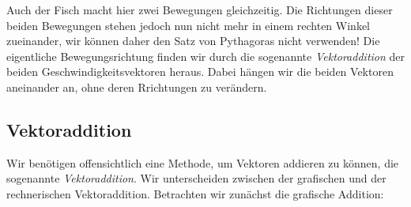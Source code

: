 \begin{solution}
Auch der Fisch macht hier zwei Bewegungen gleichzeitig. Die Richtungen dieser beiden Bewegungen stehen jedoch nun nicht mehr in einem rechten Winkel zueinander, wir können daher den Satz von Pythagoras nicht verwenden! Die eigentliche Bewegungsrichtung finden wir durch die sogenannte \textit{Vektoraddition} der beiden Geschwindigkeitsvektoren heraus. Dabei hängen wir die beiden Vektoren aneinander an, ohne deren Rrichtungen zu verändern. 
\end{solution}

\subsection{Vektoraddition}
Wir benötigen offensichtlich eine Methode, um Vektoren addieren zu können, die sogenannte \textit{Vektoraddition}. Wir unterscheiden zwischen der grafischen und der rechnerischen Vektoraddition. Betrachten wir zunächst die grafische Addition:


